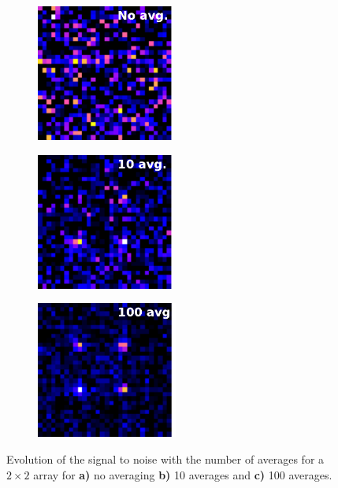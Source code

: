 \begin{figure}
    \centering
	\begin{subfigure}{.31\linewidth}
		\centering
		\includegraphics[height=4.5cm]{figures/2x2fluoresence1avg.pdf}
		\caption{}
		\label{fig:10avg}
	\end{subfigure}
	\hfill
	\begin{subfigure}{.31\linewidth}
		\centering
		\includegraphics[height=4.5cm]{figures/2x2fluoresence10avg.pdf}
		\caption{}
		\label{fig:30avg}
	\end{subfigure}
	\hfill
	\begin{subfigure}{.33\linewidth}
		\centering
		\includegraphics[height=4.5cm]{figures/2x2fluoresence100avg.pdf}
		\caption{}
		\label{fig:50avg}
	\end{subfigure}
	\caption{Evolution of the signal to noise with the number of averages for a $2\times 2$ array for \textsf{\textbf{a)}} no averaging \textsf{\textbf{b)}} 10 averages and \textsf{\textbf{c)}} 100 averages.
    }
    \label{fig:Averaging}
\end{figure}





